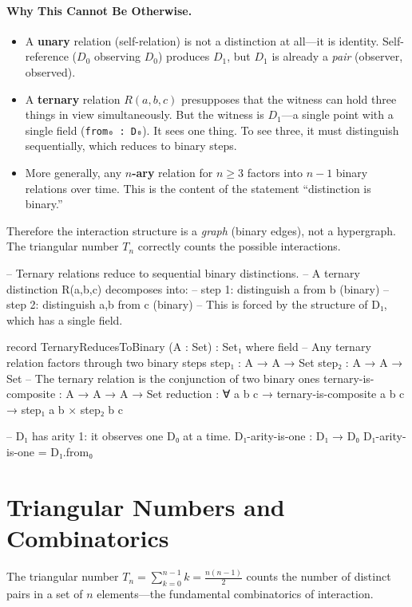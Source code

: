\documentclass[11pt,a4paper]{book}
\begin{document}
\paragraph{Why This Cannot Be Otherwise.}
\begin{itemize}
\item A \textbf{unary} relation (self-relation) is not a distinction at all---it is 
identity. Self-reference ($D_0$ observing $D_0$) produces $D_1$, but $D_1$ is 
already a \emph{pair} (observer, observed).
\item A \textbf{ternary} relation $R(a,b,c)$ presupposes that the witness can hold 
three things in view simultaneously. But the witness is $D_1$---a single point with a 
single field (\texttt{from₀ : D₀}). It sees one thing. To see three, it must 
distinguish sequentially, which reduces to binary steps.
\item More generally, any \textbf{$n$-ary} relation for $n \geq 3$ factors into 
$n - 1$ binary relations over time. This is the content of the statement ``distinction 
is binary.''
\end{itemize}

Therefore the interaction structure is a \emph{graph} (binary edges), not a hypergraph. 
The triangular number $T_n$ correctly counts the possible interactions.

\begin{code}
-- Ternary relations reduce to sequential binary distinctions.
-- A ternary distinction R(a,b,c) decomposes into:
--   step 1: distinguish a from b  (binary)
--   step 2: distinguish {a,b} from c  (binary)
-- This is forced by the structure of D₁, which has a single field.

record TernaryReducesToBinary (A : Set) : Set₁ where
  field
    -- Any ternary relation factors through two binary steps
    step₁ : A → A → Set
    step₂ : A → A → Set
    -- The ternary relation is the conjunction of two binary ones
    ternary-is-composite : A → A → A → Set
    reduction : ∀ a b c → ternary-is-composite a b c → step₁ a b × step₂ b c

-- D₁ has arity 1: it observes one D₀ at a time.
D₁-arity-is-one : D₁ → D₀
D₁-arity-is-one = D₁.from₀
\end{code}

\section{Triangular Numbers and Combinatorics}

The triangular number $T_n = \sum_{k=0}^{n-1} k = \frac{n(n-1)}{2}$ counts the number of distinct pairs in a set of $n$ elements—the fundamental combinatorics of interaction.
\end{document}
